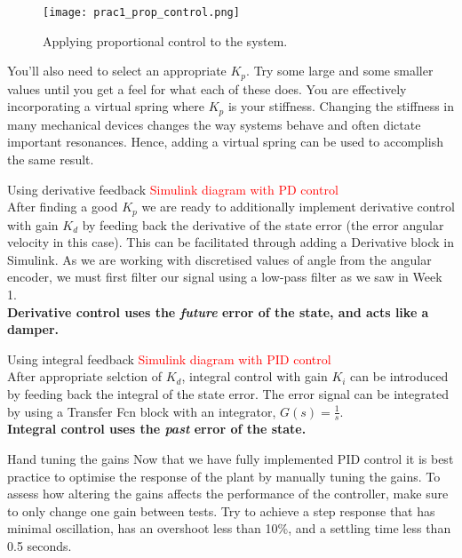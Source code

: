 \documentclass[9pt]{beamer-control}
\begin{document}
\begin{frame}
	\begin{figure}
		\centering
		\texttt{[image: prac1\_prop\_control.png]}
		\caption{Applying proportional control to the system.}
	\end{figure}
	You’ll also need to select an appropriate $K_p.$ Try some large and some smaller values until you get a feel for what each of these does. You are effectively incorporating a virtual spring where $K_p$ is your stiffness. Changing the stiffness in many mechanical devices changes the way systems behave and often dictate important resonances. Hence, adding a virtual spring can be used to accomplish the same result.
\end{frame}




\begin{frame}{Using derivative feedback}
\textcolor{red}{Simulink diagram with PD control}\\
After finding a good $K_p$ we are ready to additionally implement derivative control with gain $K_d$ by feeding back the derivative of the state error (the error angular velocity in this case). This can be facilitated through adding a Derivative block in Simulink. As we are working with discretised values of angle from the angular encoder, we must first filter our signal using a low-pass filter as we saw in Week 1.\\

\textbf{Derivative control uses the \textit{future} error of the state, and acts like a damper.}
\end{frame}


\begin{frame}{Using integral feedback}
\textcolor{red}{Simulink diagram with PID control}\\
After appropriate selction of $K_d$, integral control with gain $K_i$ can be introduced by feeding back the integral of the state error. The error signal can be integrated by using a Transfer Fcn block with an integrator, $G(s)=\tfrac{1}{s}$.\\

\textbf{Integral control uses the \textit{past} error of the state.}
\end{frame}




\begin{frame}{Hand tuning the gains}
Now that we have fully implemented PID control it is best practice to optimise the response of the plant by manually tuning the gains. To assess how altering the gains affects the performance of the controller, make sure to only change one gain between tests. Try to achieve a step response that has minimal oscillation, has an overshoot less than 10\%, and a settling time less than 0.5 seconds.\\
\end{frame}
\end{document}
